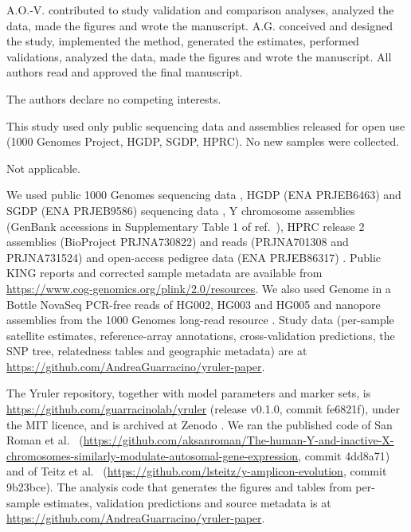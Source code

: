 \documentclass[pdflatex,sn-nature]{sn-jnl}
\begin{document}
A.O.-V. contributed to study validation and comparison analyses, analyzed the data, made the figures and wrote the manuscript. A.G. conceived and designed the study, implemented the method, generated the estimates, performed validations, analyzed the data, made the figures and wrote the manuscript. All authors read and approved the final manuscript.

The authors declare no competing interests.

This study used only public sequencing data and assemblies released for open use (1000 Genomes Project, HGDP, SGDP, HPRC). No new samples were collected.

Not applicable.

We used public 1000 Genomes sequencing data \cite{ByrskaBishop2022}, HGDP (ENA PRJEB6463) and SGDP (ENA PRJEB9586) sequencing data \cite{Bergstrom2020,Mallick2016}, Y chromosome assemblies (GenBank accessions in Supplementary Table 1 of ref.~\cite{Hallast2026}), HPRC release 2 assemblies (BioProject PRJNA730822) and reads (PRJNA701308 and PRJNA731524) \cite{HPRCRelease2} and open-access pedigree data (ENA PRJEB86317) \cite{Porubsky2025}. Public KING reports and corrected sample metadata are available from \url{https://www.cog-genomics.org/plink/2.0/resources}. We also used Genome in a Bottle NovaSeq PCR-free reads of HG002, HG003 and HG005 and nanopore assemblies from the 1000 Genomes long-read resource \cite{Gustafson2024}. Study data (per-sample satellite estimates, reference-array annotations, cross-validation predictions, the SNP tree, relatedness tables and geographic metadata) are at \url{https://github.com/AndreaGuarracino/yruler-paper}.

The Yruler repository, together with model parameters and marker sets, is \url{https://github.com/guarracinolab/yruler} (release v0.1.0, commit fe6821f), under the MIT licence, and is archived at Zenodo \cite{YrulerZenodo}. We ran the published code of San Roman et al.\ \cite{SanRoman2024} (\url{https://github.com/aksanroman/The-human-Y-and-inactive-X-chromosomes-similarly-modulate-autosomal-gene-expression}, commit 4dd8a71) and of Teitz et al.\ \cite{Teitz2018} (\url{https://github.com/lsteitz/y-amplicon-evolution}, commit 9b23bce). The analysis code that generates the figures and tables from per-sample estimates, validation predictions and source metadata is at \url{https://github.com/AndreaGuarracino/yruler-paper}.


\end{document}
